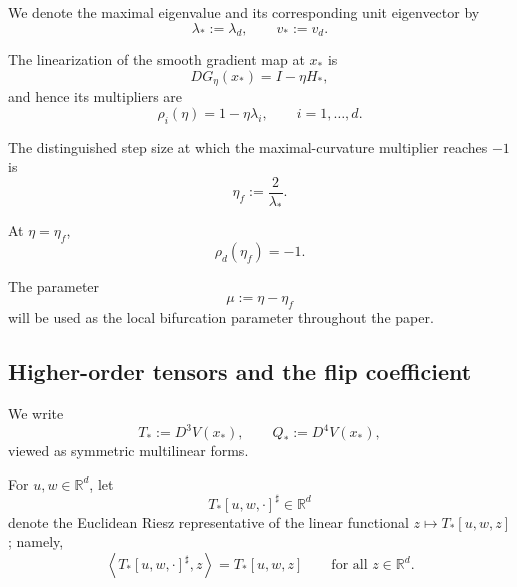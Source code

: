 We denote the maximal eigenvalue and its corresponding unit
eigenvector by
\begin{equation}
\lambda_*:=\lambda_d,
\qquad
v_*:=v_d.
\label{eq:critical-eigenpair}
\end{equation}

The linearization of the smooth gradient map at $x_*$ is
\begin{equation}
DG_\eta(x_*)
=
I-\eta H_*,
\label{eq:GD-linearization}
\end{equation}
and hence its multipliers are
\begin{equation}
\rho_i(\eta)
=
1-\eta\lambda_i,
\qquad
i=1,\ldots,d.
\label{eq:GD-multipliers}
\end{equation}

The distinguished step size at which the maximal-curvature
multiplier reaches $-1$ is
\begin{equation}
\eta_f
:=
\frac{2}{\lambda_*}.
\label{eq:eta-f}
\end{equation}

At $\eta=\eta_f$,
\begin{equation}
\rho_d(\eta_f)=-1.
\label{eq:critical-multiplier}
\end{equation}

The parameter
\begin{equation}
\mu:=\eta-\eta_f
\label{eq:mu-definition}
\end{equation}
will be used as the local bifurcation parameter throughout the paper.

\subsection{Higher-order tensors and the flip coefficient}
\label{subsec:flip-coefficient-notation}

We write
\begin{equation}
T_*:=D^3V(x_*),
\qquad
Q_*:=D^4V(x_*),
\label{eq:TQ-definitions}
\end{equation}
viewed as symmetric multilinear forms.

For $u,w\in\mathbb{R}^d$, let
\begin{equation}
T_*[u,w,\cdot]^\sharp
\in\mathbb{R}^d
\label{eq:sharp-definition}
\end{equation}
denote the Euclidean Riesz representative of the linear functional
$z\mapsto T_*[u,w,z]$; namely,
\begin{equation}
\left\langle
T_*[u,w,\cdot]^\sharp,z
\right\rangle
=
T_*[u,w,z]
\qquad
\text{for all }z\in\mathbb{R}^d.
\label{eq:sharp-identity}
\end{equation}

